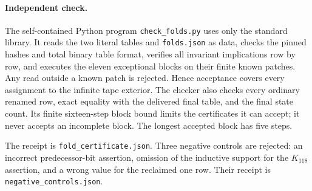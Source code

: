 \paragraph{Independent check.}
The self-contained Python program \texttt{check\_folds.py} uses only the
standard library.  It reads the two literal tables and \texttt{folds.json}
as data, checks the pinned hashes and total binary table format, verifies
all invariant implications row by row, and executes the eleven exceptional
blocks on their finite known patches.  Any read outside a known patch is
rejected.  Hence acceptance covers every assignment to the infinite tape
exterior.  The checker also checks every ordinary renamed row, exact equality
with the delivered final table, and the final state count.  Its finite
sixteen-step block bound limits the certificates it can accept; it never
accepts an incomplete block.  The longest accepted block has five steps.

The receipt is \texttt{fold\_certificate.json}.  Three negative controls
are rejected: an incorrect predecessor-bit assertion, omission of the
inductive support for the $K_{118}$ assertion, and a wrong value for the
reclaimed one row.  Their receipt is \texttt{negative\_controls.json}.
